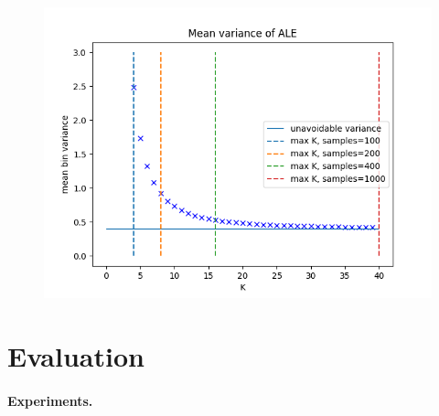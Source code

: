 \documentclass{article}
\begin{document}
\begin{figure}[!h]
  \centering
  \includegraphics[width=.7\linewidth]{./example_gromping_paper/bin_varinace}
  \caption{}
  \label{fig:im2}
\end{figure}


\section{Evaluation}
\label{sec:evaluation}

\paragraph{Experiments.}


\end{document}
